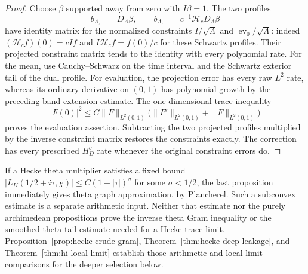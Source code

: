 \begin{proof}
Choose $\beta$ supported away from zero with $I\beta=1$.
The two profiles
\[
 b_{\Lambda,+}=D_\Lambda\beta,\qquad
 b_{\Lambda,-}=c^{-1}\mathcal H_cD_\Lambda\beta
\]
have identity matrix for the normalized constraints
$I/\sqrt\Lambda$ and $\operatorname{ev}_0/\sqrt\Lambda$:
indeed $(\mathcal H_cf)(0)=cIf$ and
$I\mathcal H_cf=f(0)/c$ for these Schwartz profiles.
Their projected constraint matrix tends to the identity with
every polynomial rate. For the mean, use Cauchy--Schwarz on the
time interval and the Schwartz exterior tail of the dual profile.
For evaluation, the projection error has every raw $L^2$ rate,
whereas its ordinary derivative on $(0,1)$ has polynomial growth
by the preceding band-extension estimate. The one-dimensional
trace inequality
\[
 |F(0)|^2\leq C\|F\|_{L^2(0,1)}
          \bigl(\|F'\|_{L^2(0,1)}+\|F\|_{L^2(0,1)}\bigr)
\]
proves the evaluation assertion. Subtracting the two projected
profiles multiplied by the inverse constraint matrix restores
the constraints exactly. The correction has every prescribed
$H_D^\sigma$ rate whenever the original constraint errors do.
\end{proof}

If a Hecke theta multiplier satisfies a fixed bound
$|L_K(1/2+i\tau,\chi)|\leq C(1+|\tau|)^\sigma$ for some
$\sigma<1/2$, the last proposition immediately gives theta graph
approximation, by Plancherel. Such a subconvex estimate is a
separate arithmetic input. Neither that estimate nor the purely
archimedean propositions prove the inverse theta Gram inequality
or the smoothed theta-tail estimate needed for a Hecke trace limit.
Proposition~\ref{prop:hecke-crude-gram},
Theorem~\ref{thm:hecke-deep-leakage}, and
Theorem~\ref{thm:hi-local-limit} establish those arithmetic and
local-limit comparisons for the deeper selection below.
